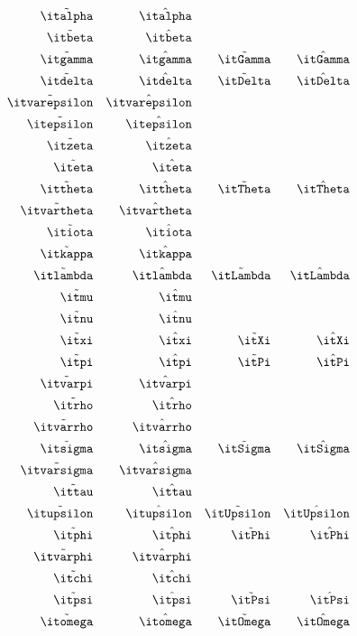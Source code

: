 \begin{align*}
  \tilde{\italpha}    && \hat{\italpha} \\
  \tilde{\itbeta}     && \hat{\itbeta}  \\
  \tilde{\itgamma}    && \hat{\itgamma} && \tilde{\itGamma} && \hat{\itGamma} \\
  \tilde{\itdelta}    && \hat{\itdelta} && \tilde{\itDelta} && \hat{\itDelta} \\
  \tilde{\itvarepsilon} &&\hat{\itvarepsilon} \\
  \tilde{\itepsilon}  && \hat{\itepsilon} \\
  \tilde{\itzeta}     && \hat{\itzeta} \\
  \tilde{\iteta}      && \hat{\iteta}  \\
  \tilde{\ittheta}    && \hat{\ittheta} && \tilde{\itTheta} && \hat{\itTheta} \\
  \tilde{\itvartheta} &&\hat{\itvartheta} \\
  \tilde{\itiota}     && \hat{\itiota} \\
  \tilde{\itkappa}    && \hat{\itkappa} \\
  \tilde{\itlambda}   &&\hat{\itlambda} &&\tilde{\itLambda} &&\hat{\itLambda} \\
  \tilde{\itmu}       &&\hat{\itmu} \\
  \tilde{\itnu}       &&\hat{\itnu} \\
  \tilde{\itxi}       &&\hat{\itxi}     &&\tilde{\itXi}     &&\hat{\itXi} \\
  \tilde{\itpi}       &&\hat{\itpi}     &&\tilde{\itPi}     &&\hat{\itPi} \\
  \tilde{\itvarpi}    && \hat{\itvarpi} \\
  \tilde{\itrho}      && \hat{\itrho} \\
  \tilde{\itvarrho}   &&\hat{\itvarrho} \\
  \tilde{\itsigma}    && \hat{\itsigma} && \tilde{\itSigma} && \hat{\itSigma} \\
  \tilde{\itvarsigma} && \hat{\itvarsigma} \\
  \tilde{\ittau}      && \hat{\ittau} \\
  \tilde{\itupsilon}  && \hat{\itupsilon} && \tilde{\itUpsilon} && \hat{\itUpsilon} \\
  \tilde{\itphi}      && \hat{\itphi}   && \tilde{\itPhi} && \hat{\itPhi} \\
  \tilde{\itvarphi}   &&\hat{\itvarphi} \\
  \tilde{\itchi}      && \hat{\itchi} \\
  \tilde{\itpsi}      && \hat{\itpsi}   && \tilde{\itPsi}   && \hat{\itPsi} \\
  \tilde{\itomega}    && \hat{\itomega} && \tilde{\itOmega} && \hat{\itOmega}
\end{align*}

